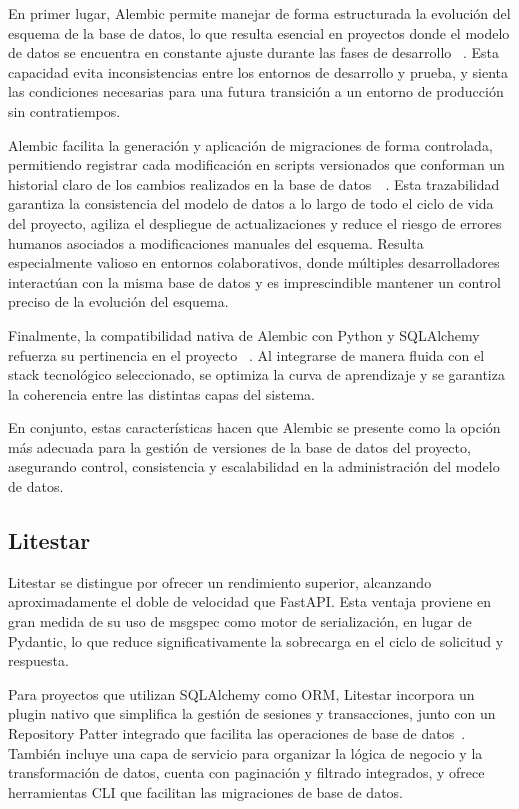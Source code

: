 En primer lugar, Alembic permite manejar de forma estructurada la evolución del esquema de la base de datos, lo que resulta esencial en proyectos donde el modelo de datos se encuentra en constante ajuste durante las fases de desarrollo ~\cite{pingcap_alembic}. Esta capacidad evita inconsistencias entre los entornos de desarrollo y prueba, y sienta las condiciones necesarias para una futura transición a un entorno de producción sin contratiempos.

Alembic facilita la generación y aplicación de migraciones de forma controlada, permitiendo registrar cada modificación en scripts versionados que conforman un historial claro de los cambios realizados en la base de datos~\cite{pingcap_alembic}~\cite{devto_alembic}. Esta trazabilidad garantiza la consistencia del modelo de datos a lo largo de todo el ciclo de vida del proyecto, agiliza el despliegue de actualizaciones y reduce el riesgo de errores humanos asociados a modificaciones manuales del esquema. Resulta especialmente valioso en entornos colaborativos, donde múltiples desarrolladores interactúan con la misma base de datos y es imprescindible mantener un control preciso de la evolución del esquema.

Finalmente, la compatibilidad nativa de Alembic con Python y SQLAlchemy refuerza su pertinencia en el proyecto ~\cite{pingcap_alembic}. Al integrarse de manera fluida con el stack tecnológico seleccionado, se optimiza la curva de aprendizaje y se garantiza la coherencia entre las distintas capas del sistema.

En conjunto, estas características hacen que Alembic se presente como la opción más adecuada para la gestión de versiones de la base de datos del proyecto, asegurando control, consistencia y escalabilidad en la administración del modelo de datos.

\subsection{Litestar}

Litestar se distingue por ofrecer un rendimiento superior, alcanzando aproximadamente el doble de velocidad que FastAPI. Esta ventaja proviene en gran medida de su uso de msgspec como motor de serialización, en lugar de Pydantic, lo que reduce significativamente la sobrecarga en el ciclo de solicitud y respuesta.
~\cite{betterstack_litestar_fastapi}~\cite{plainenglish_litestar_fastapi}

Para proyectos que utilizan SQLAlchemy como ORM, Litestar incorpora un plugin nativo que simplifica la gestión de sesiones y transacciones, junto con un Repository Patter integrado que facilita las operaciones de base de datos~\cite{litestar_advanced_alchemy}. También incluye una capa de servicio para organizar la lógica de negocio y la transformación de datos, cuenta con paginación y filtrado integrados, y ofrece herramientas CLI que facilitan las migraciones de base de datos.
~\cite{betterstack_litestar_fastapi}~\cite{litestar_advanced_alchemy}

